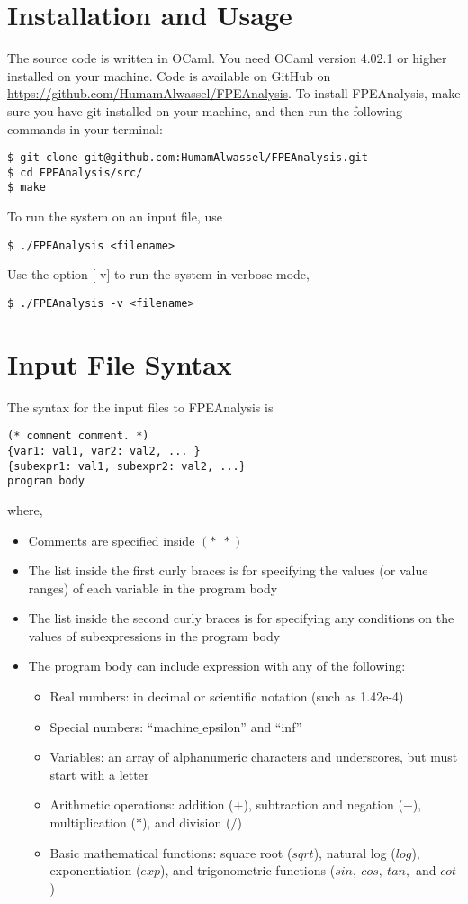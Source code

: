 \documentclass{article}
\begin{document}
\section{Installation and Usage}
The source code is written in OCaml. You need OCaml version 4.02.1 or higher installed on your machine. Code is available on GitHub on \href{https://github.com/HumamAlwassel/FPEAnalysis}{https://github.com/HumamAlwassel/FPEAnalysis}. To install FPEAnalysis, make sure you have git installed on your machine, and then run the following commands in your terminal:

\begin{verbatim}
$ git clone git@github.com:HumamAlwassel/FPEAnalysis.git 
$ cd FPEAnalysis/src/
$ make
\end{verbatim}
To run the system on an input file, use
\begin{verbatim}
$ ./FPEAnalysis <filename>
\end{verbatim}
Use the option [-v] to run the system in verbose mode,
\begin{verbatim}
$ ./FPEAnalysis -v <filename>
\end{verbatim}

\clearpage
\section{Input File Syntax}
The syntax for the input files to FPEAnalysis is 

\begin{verbatim}
(* comment comment. *)
{var1: val1, var2: val2, ... }
{subexpr1: val1, subexpr2: val2, ...}
program body 
\end{verbatim}

\noindent where, 

\begin{itemize}
  \item Comments are specified inside $(*\ \ *)$
  \item The list inside the first curly braces is for specifying the values (or value ranges) of each variable in the program body
  \item The list inside the second curly braces is for specifying any conditions on the values of subexpressions in the program body
  \item The program body can include expression with any of the following:
	\begin{itemize}
		\item Real numbers: in decimal or scientific notation (such as 1.42e-4)
		\item Special numbers: ``machine$\_$epsilon'' and ``inf''
		\item Variables: an array of alphanumeric characters and underscores, but must start with a letter
		\item Arithmetic operations: addition ($+$), subtraction and negation ($-$), multiplication ($*$), and division ($/$)
		\item Basic mathematical functions: square root ($sqrt$), natural log ($log$), exponentiation ($exp$), and trigonometric functions ($sin,\ cos,\ tan,$ and $cot$)
	\end{itemize}
\end{itemize}
\end{document}
